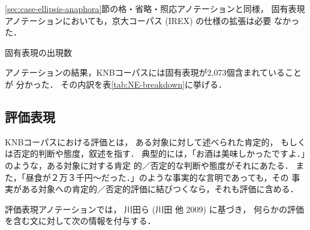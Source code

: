 \documentclass[japanese]{jnlp_JS2.0}
\begin{document}
\ref{sec:case-ellipsis-anaphora}節の格・省略・照応アノテーションと同様，
固有表現アノテーションにおいても，京大コーパス (IREX) の仕様の拡張は必要
なかった．

\begin{table}[b]
\caption{固有表現の出現数}
\label{tab:NE-breakdown}

\end{table}

アノテーションの結果，KNBコーパスには固有表現が2,073個含まれていることが
分かった．
その内訳を表\ref{tab:NE-breakdown}に挙げる．



\subsection{評価表現 \label{sec:evalexp}}

KNBコーパスにおける評価とは，
ある対象に対して述べられた肯定的，
もしくは否定的判断や態度，叙述を指す．
典型的には，「お酒は美味しかったですよ．」のような，ある対象に対する肯定
的／否定的な判断や態度がそれにあたる．
また，「昼食が２万３千円〜だった．」のような事実的な言明であっても，その
事実がある対象への肯定的／否定的評価に結びつくなら，それも評価に含める．


評価表現アノテーションでは，
    川田ら (川田 他 2009) に基づき，
何らかの評価を含む文に対して次の情報を付与する．
\end{document}
